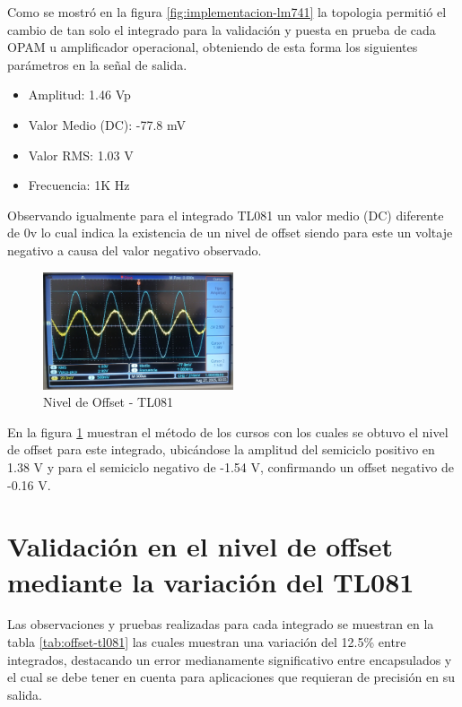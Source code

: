 Como se mostró en la figura \ref{fig:implementacion-lm741} la topologia permitió el cambio de tan solo el integrado para la validación y puesta en prueba de cada OPAM u amplificador operacional, obteniendo de esta forma los siguientes parámetros en la señal de salida.

\begin{itemize}
	\item Amplitud: 1.46 Vp
	\item Valor Medio (DC): -77.8 mV
	\item Valor RMS: 1.03 V
	\item Frecuencia: 1K Hz
\end{itemize}

Observando igualmente para el integrado TL081 un valor medio (DC) diferente de 0v lo cual indica la existencia de un nivel de offset siendo para este un voltaje negativo a causa del valor negativo observado.

\begin{figure}[h]
	\centering
	\includegraphics[width=0.5\textwidth]{media/offset-081}
	\caption{Nivel de Offset - TL081}
	\label{fig:offset-081}
\end{figure}

En la figura \ref{fig:offset-081} muestran el método de los cursos con los cuales se obtuvo el nivel de offset para este integrado, ubicándose la amplitud del semiciclo positivo en 1.38 V y para el semiciclo negativo de -1.54 V, confirmando un offset negativo de -0.16 V.

\section{Validación en el nivel de offset mediante la variación del TL081}

Las observaciones y pruebas realizadas para cada integrado se muestran en la tabla \ref{tab:offset-tl081} las cuales muestran una variación del 12.5\% entre integrados, destacando un error medianamente significativo entre encapsulados y el cual se debe tener en cuenta para aplicaciones que requieran de precisión en su salida.

